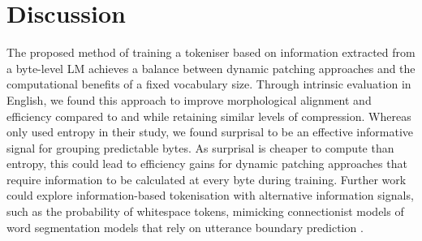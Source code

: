 

\section{Discussion}
\label{sec:discussion}

The proposed method of training a tokeniser based on information extracted from a byte-level LM achieves a balance between dynamic patching approaches and the computational benefits of a fixed vocabulary size. Through intrinsic evaluation in English, we found this approach to improve morphological alignment and \renyi efficiency compared to \bpe and \bpewp while retaining similar levels of compression. Whereas \citet{pagnoni2024byte} only used entropy in their study, we found surprisal to be an effective informative signal for grouping predictable bytes. As surprisal is cheaper to compute than entropy, this could lead to efficiency gains for dynamic patching approaches that require information to be calculated at every byte during training. Further work could explore information-based tokenisation with alternative information signals, such as the probability of whitespace tokens, mimicking connectionist models of word segmentation models that rely on utterance boundary prediction \citep{christiansen1998learning}.

